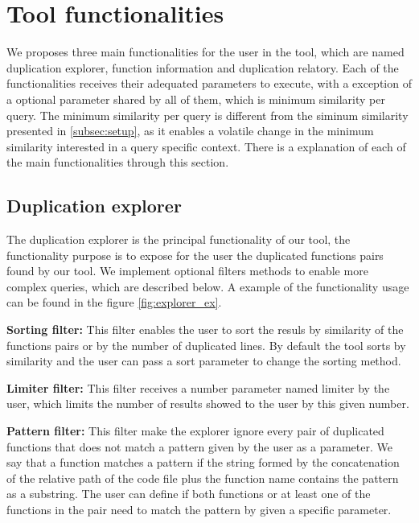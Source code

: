 \en

\section{Tool functionalities}
\label{subsec:func}

We proposes three main functionalities for the user in the tool, which are named duplication explorer, function information
and duplication relatory. Each of the functionalities receives their adequated parameters to execute, with a exception
of a optional parameter shared by all of them, which is minimum similarity per query. The minimum similarity per query is different
from the siminum similarity presented in \ref{subsec:setup}, as it enables a volatile change in the minimum similarity
interested in a query specific context. There is a explanation of each of the main functionalities through this section.

\subsection{Duplication explorer}

The duplication explorer is the principal functionality of our tool, the functionality purpose is to expose for the user the 
duplicated functions pairs found by our tool. We implement optional filters methods to enable more complex queries, 
which are described below. A example of the functionality usage can be found in the figure \ref{fig:explorer_ex}.


\begin{itemize}
	\begin{item}
		\textbf{Sorting filter:} This filter enables the user to sort the resuls by similarity of the functions pairs or 
		by the number of duplicated lines. By default the tool sorts by similarity and the user can pass a sort parameter to change
		the sorting method.
	\end{item}

	\begin{item}
		\textbf{Limiter filter:} This filter receives a number parameter named limiter by the user, which limits the number of results
		showed to the user by this given number.
	\end{item}

	\begin{item}
		\textbf{Pattern filter:} This filter make the explorer ignore every pair of duplicated functions that does not match a pattern
		given by the user as a parameter. We say that a function matches a pattern if the string formed by the concatenation of
		the relative path of the code file plus the function name contains the pattern as a substring. 
		The user can define if both functions or at least one of the 
		functions in the pair need to match the pattern by given a specific parameter.
	\end{item}
\end{itemize}

